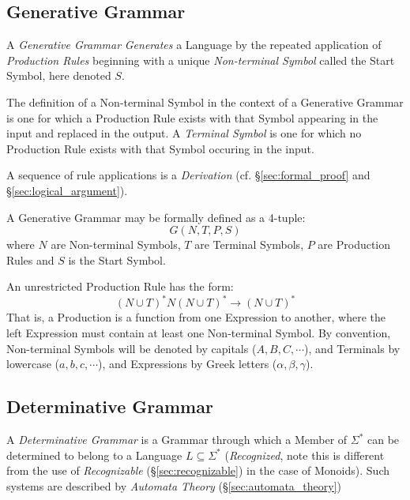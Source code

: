 \subsection{Generative Grammar}\label{sec:generative_grammar}

A \emph{Generative Grammar} \emph{Generates} a Language by the repeated
application of \emph{Production Rules} beginning with a unique
\emph{Non-terminal Symbol} called the Start Symbol, here denoted $S$.

The definition of a Non-terminal Symbol in the context of a Generative Grammar
is one for which a Production Rule exists with that Symbol appearing in the
input and replaced in the output. A \emph{Terminal Symbol} is one for which no
Production Rule exists with that Symbol occuring in the input.

A sequence of rule applications is a \emph{Derivation} (cf.
\S\ref{sec:formal_proof} and \S\ref{sec:logical_argument}).

A Generative Grammar may be formally defined as a 4-tuple:
\[
  G(N,T,P,S)
\]
where $N$ are Non-terminal Symbols, $T$ are Terminal Symbols, $P$ are Production
Rules and $S$ is the Start Symbol.

An unrestricted Production Rule has the form:
\[
  (N \cup T)^*N(N \cup T)^* \rightarrow (N \cup T)^*
\]
That is, a Production is a function from one Expression to another, where the
left Expression must contain at least one Non-terminal Symbol. By convention,
Non-terminal Symbols will be denoted by capitals ($A,B,C,\cdots$), and Terminals
by lowercase ($a,b,c,\cdots$), and Expressions by Greek letters
($\alpha,\beta,\gamma$).



\subsection{Determinative Grammar}\label{sec:determinative_grammar}

A \emph{Determinative Grammar} is a Grammar through which a Member of $\Sigma^*$
can be determined to belong to a Language $L \subseteq \Sigma^*$
(\emph{Recognized}, note this is different from the use of \emph{Recognizable}
(\S\ref{sec:recognizable}) in the case of Monoids). Such systems are described
by \emph{Automata Theory} (\S\ref{sec:automata_theory})

